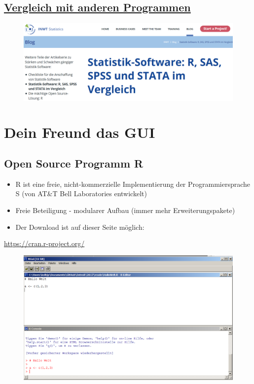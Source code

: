 \documentclass[]{article}
\begin{document}
\subsection{\texorpdfstring{\href{https://www.inwt-statistics.de/blog-artikel-lesen/Statistik-Software-R_SAS_SPSS_STATA_im_Vergleich.html}{Vergleich
mit anderen
Programmen}}{Vergleich mit anderen Programmen}}\label{vergleich-mit-anderen-programmen}

\begin{figure}[htbp]
\centering
\includegraphics{figure/SoftwareVergleich.PNG}
\caption{}
\end{figure}

\section{Dein Freund das GUI}\label{dein-freund-das-gui}

\subsection{Open Source Programm R}\label{open-source-programm-r}

\begin{itemize}
\item
  R ist eine freie, nicht-kommerzielle Implementierung der
  Programmiersprache S (von AT\&T Bell Laboratories entwickelt)
\item
  Freie Beteiligung - modularer Aufbau (immer mehr Erweiterungspakete)
\item
  Der Download ist auf dieser Seite möglich:
\end{itemize}

\url{https://cran.r-project.org/}

\begin{figure}[htbp]
\centering
\includegraphics{figure/BasisR.PNG}
\caption{}
\end{figure}
\end{document}
